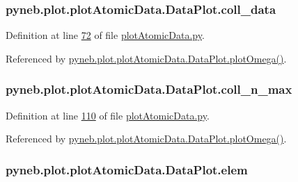 \subsubsection[{coll\+\_\+data}]{\setlength{\rightskip}{0pt plus 5cm}pyneb.\+plot.\+plot\+Atomic\+Data.\+Data\+Plot.\+coll\+\_\+data}\label{classpyneb_1_1plot_1_1plot_atomic_data_1_1_data_plot_a50a9af3695633a64c66d082ed67d1bfb}


Definition at line \hyperlink{plot_atomic_data_8py_source_l00072}{72} of file \hyperlink{plot_atomic_data_8py_source}{plot\+Atomic\+Data.\+py}.



Referenced by \hyperlink{plot_atomic_data_8py_source_l00372}{pyneb.\+plot.\+plot\+Atomic\+Data.\+Data\+Plot.\+plot\+Omega()}.

\hypertarget{classpyneb_1_1plot_1_1plot_atomic_data_1_1_data_plot_aa15b01aa8da5eac903d797c2a1af3461}{}
\subsubsection[{coll\+\_\+n\+\_\+max}]{\setlength{\rightskip}{0pt plus 5cm}pyneb.\+plot.\+plot\+Atomic\+Data.\+Data\+Plot.\+coll\+\_\+n\+\_\+max}\label{classpyneb_1_1plot_1_1plot_atomic_data_1_1_data_plot_aa15b01aa8da5eac903d797c2a1af3461}


Definition at line \hyperlink{plot_atomic_data_8py_source_l00110}{110} of file \hyperlink{plot_atomic_data_8py_source}{plot\+Atomic\+Data.\+py}.



Referenced by \hyperlink{plot_atomic_data_8py_source_l00372}{pyneb.\+plot.\+plot\+Atomic\+Data.\+Data\+Plot.\+plot\+Omega()}.

\hypertarget{classpyneb_1_1plot_1_1plot_atomic_data_1_1_data_plot_ae936c57b93cc86a5cf28f8838164940a}{}
\subsubsection[{elem}]{\setlength{\rightskip}{0pt plus 5cm}pyneb.\+plot.\+plot\+Atomic\+Data.\+Data\+Plot.\+elem}\label{classpyneb_1_1plot_1_1plot_atomic_data_1_1_data_plot_ae936c57b93cc86a5cf28f8838164940a}


